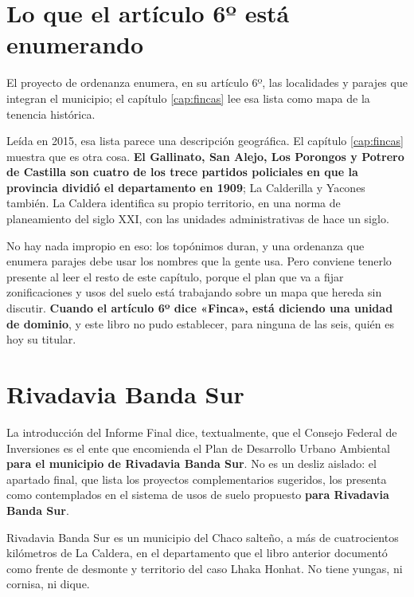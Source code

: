 \section{Lo que el artículo 6º está enumerando}

El proyecto de ordenanza enumera, en su artículo 6º, las localidades y parajes que integran el municipio; el capítulo \ref{cap:fincas} lee esa lista como mapa de la tenencia histórica.

Leída en 2015, esa lista parece una descripción geográfica. El capítulo \ref{cap:fincas} muestra que es otra
cosa. \textbf{El Gallinato, San Alejo, Los Porongos y Potrero de Castilla son cuatro de los
trece partidos policiales en que la provincia dividió el departamento en 1909}; La Calderilla
y Yacones también. La Caldera identifica su propio territorio, en una norma de planeamiento
del siglo XXI, con las unidades administrativas de hace un siglo.

No hay nada impropio en eso: los topónimos duran, y una ordenanza que enumera parajes debe
usar los nombres que la gente usa. Pero conviene tenerlo presente al leer el resto de este
capítulo, porque el plan que va a fijar zonificaciones y usos del suelo está trabajando sobre
un mapa que hereda sin discutir. \textbf{Cuando el artículo 6º dice «Finca», está diciendo
una unidad de dominio}, y este libro no pudo establecer, para ninguna de las seis, quién es
hoy su titular.

\section{Rivadavia Banda Sur}

La introducción del Informe Final dice, textualmente, que el Consejo Federal de Inversiones es el ente que encomienda el Plan de Desarrollo Urbano Ambiental \textbf{para el municipio de Rivadavia Banda Sur}. No es un desliz aislado: el apartado final, que lista los proyectos complementarios sugeridos, los presenta como contemplados en el sistema de usos de suelo propuesto \textbf{para Rivadavia Banda Sur}.

Rivadavia Banda Sur es un municipio del Chaco salteño, a más de cuatrocientos kilómetros de La Caldera, en el departamento que el libro anterior documentó como frente de desmonte y territorio del caso Lhaka Honhat. No tiene yungas, ni cornisa, ni dique.


